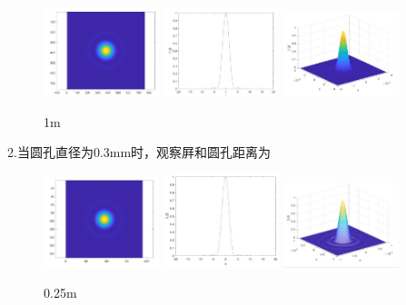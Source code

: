 \documentclass[12pt,a4paper,UTF8]{ctexart}
\begin{document}
\begin{figure}[htbp]
	\centering
	\includegraphics[width=0.3\textwidth]{img//1.1.jpg}
	\includegraphics[width=0.3\textwidth]{img//1.2.jpg}
	\includegraphics[width=0.3\textwidth]{img//1.3.jpg}
	\caption{1m}
\end{figure}
\newpage
2.当圆孔直径为0.3mm时，观察屛和圆孔距离为
\begin{figure}[htbp]
	\centering
	\includegraphics[width=0.3\textwidth]{img//0.257.jpg}
	\includegraphics[width=0.3\textwidth]{img//0.258.jpg}
	\includegraphics[width=0.3\textwidth]{img//0.259.jpg}
	\caption{0.25m}
\end{figure}
\end{document}
